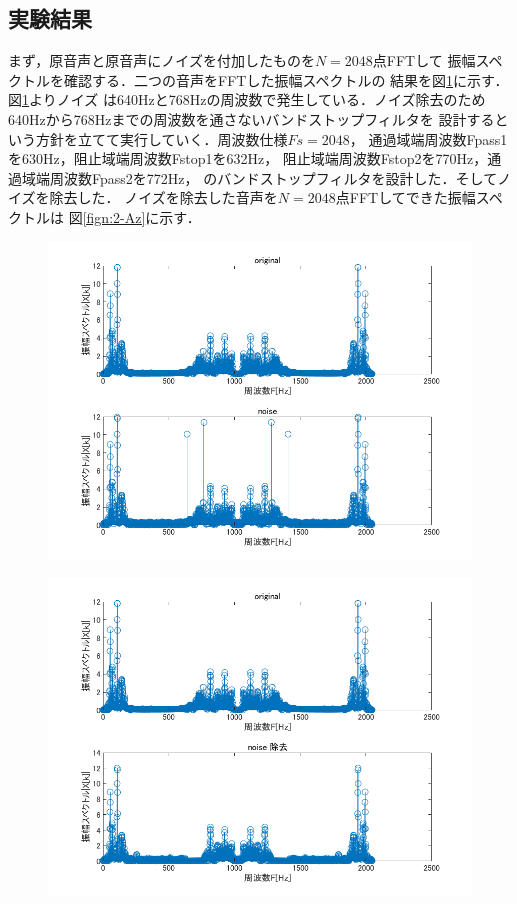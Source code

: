 \documentclass[11pt, a4paper, titlepage]{ltjsarticle}
\begin{document}
\subsection*{実験結果}
まず，原音声と原音声にノイズを付加したものを$N=2048$点FFTして
振幅スペクトルを確認する．二つの音声をFFTした振幅スペクトルの
結果を図\ref*{fign:2-Ao}に示す．図\ref*{fign:2-Ao}よりノイズ
は640Hzと768Hzの周波数で発生している．ノイズ除去のため
640Hzから768Hzまでの周波数を通さないバンドストップフィルタを
設計するという方針を立てて実行していく．周波数仕様$Fs=2048$，
通過域端周波数Fpass1を630Hz，阻止域端周波数Fstop1を632Hz，
阻止域端周波数Fstop2を770Hz，通過域端周波数Fpass2を772Hz，
のバンドストップフィルタを設計した．そしてノイズを除去した．
ノイズを除去した音声を$N=2048$点FFTしてできた振幅スペクトルは
図\ref*{fign:2-Az}に示す．
\begin{figure}[h]
    \begin{center}
    \begin{minipage}[t]{0.48\columnwidth}
        \includegraphics[width=\columnwidth]{figures/2-Ahikaku.png}
        \label{fign:2-Ao}
    \end{minipage}
    \begin{minipage}[t]{0.48\columnwidth}
        \includegraphics[width=\columnwidth]{figures/2-Azyokyo.png}

\end{minipage}
\end{center}
\end{figure}
\end{document}
